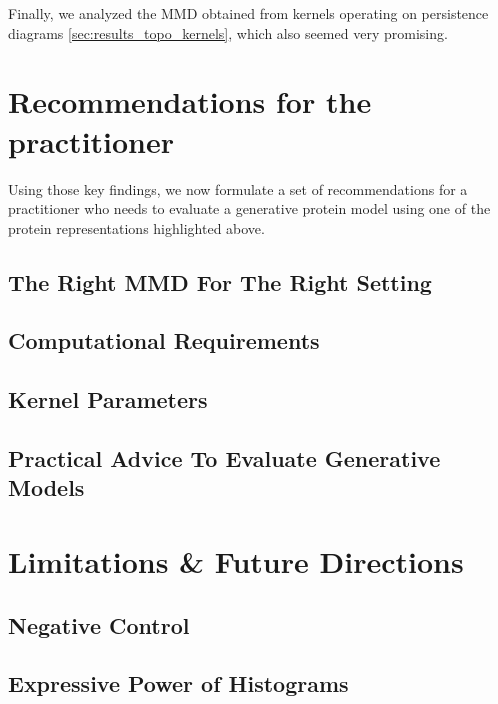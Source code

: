 Finally, we analyzed the MMD obtained from kernels operating on persistence
diagrams \ref{sec:results_topo_kernels}, which also seemed very promising.

\section{Recommendations for the
practitioner}\label{sec:discussion_recommendations}

Using those key findings, we now formulate a set of recommendations for a
practitioner who needs to evaluate a generative protein model using one of the
protein representations highlighted above.

\subsection{The Right MMD For The Right Setting}\label{sec:discussion_right_mmd}

\subsection{Computational Requirements}

\subsection{Kernel Parameters}

\subsection{Practical Advice To Evaluate Generative Models}

\section{Limitations \& Future Directions}

\subsection{Negative Control}

\subsection{Expressive Power of Histograms}

